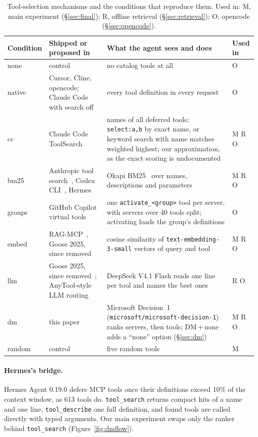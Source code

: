 \documentclass[11pt]{article}
\newcommand{\dmn}{DM\,+\,none}
\begin{document}
\begin{table}[t]
\centering\footnotesize
\caption{Tool-selection mechanisms and the conditions that reproduce them. Used in: M, main experiment
(\S\ref{sec:final}); R, offline retrieval (\S\ref{sec:retrieval}); O, opencode (\S\ref{sec:opencode}).}
\label{tab:mechanisms}
\setlength{\tabcolsep}{4pt}
\begin{tabularx}{\linewidth}{@{}l >{\raggedright\arraybackslash}p{3.6cm} X l@{}}
\toprule
Condition & Shipped or proposed in & What the agent sees and does & Used in \\
\midrule
none & control & no catalog tools at all & O \\
native & Cursor, Cline, opencode; Claude Code with search off & every tool definition in every request & O \\
cc & Claude Code ToolSearch~\citep{claudecode} & names of all deferred tools; \texttt{select:a,b} by exact name, or keyword search with name matches weighted highest; our approximation, as the exact scoring is undocumented & M R O \\
bm25 & Anthropic tool search~\citep{anthropic2025toolsearch}, Codex CLI~\citep{codexcli}, Hermes~\citep{hermesagent} & Okapi BM25~\citep{robertson2009bm25} over names, descriptions and parameters & M R O \\
groups & GitHub Copilot virtual tools~\citep{copilotvirtualtools} & one \texttt{activate\_<group>} tool per server, with servers over 40 tools split; activating loads the group's definitions & O \\
embed & RAG-MCP~\citep{gan2025ragmcp}, Goose 2025, since removed~\citep{goose} & cosine similarity of \texttt{text-embedding-3-small} vectors of query and tool & M R O \\
llm & Goose 2025, since removed~\citep{goose}; AnyTool-style LLM routing~\citep{du2024anytool} & DeepSeek V4.1 Flash reads one line per tool and names the best ones & R O \\
dm & this paper & Microsoft Decision~1 (\texttt{microsoft/microsoft-decision-1}) ranks servers, then tools; \dmn{} adds a ``none'' option (\S\ref{sec:dm}) & M R O \\
random & control & five random tools & M \\
\bottomrule
\end{tabularx}
\end{table}

\paragraph{Hermes's bridge.} Hermes Agent 0.19.0 defers MCP tools once their definitions exceed 10\% of the
context window, as 613 tools do. \texttt{tool\_search} returns compact hits of a name and one line,
\texttt{tool\_describe} one full definition, and found tools are called directly with typed arguments. Our main
experiment swaps only the ranker behind \texttt{tool\_search} (Figure~\ref{fig:dmflow}).
\end{document}
